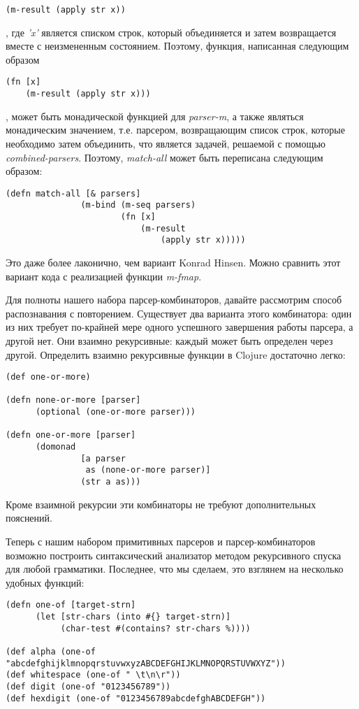 \documentclass[a4paper,12pt]{article}
\newcommand{\cl}[1] {{\it #1}}
\begin{document}
\begin{verbatim}
(m-result (apply str x))
\end{verbatim}
, где \cl{'x'} является списком строк, который объединяется и затем возвращается вместе с неизмененным состоянием. 
Поэтому, функция, написанная следующим образом

\begin{verbatim}
(fn [x]
    (m-result (apply str x)))
\end{verbatim}
, может быть монадической функцией для \cl{parser-m}, а также являться монадическим значением, т.е. парсером,
возвращающим список строк, которые необходимо затем объединить, что является задачей, решаемой с помощью 
\cl{combined-parsers}. Поэтому, \cl{match-all} может быть переписана следующим образом:

\begin{verbatim}
(defn match-all [& parsers]
               (m-bind (m-seq parsers)
                       (fn [x]
                           (m-result
                               (apply str x)))))
\end{verbatim}

Это даже более лаконично, чем вариант Konrad Hinsen. Можно сравнить этот вариант кода с реализацией функции \cl{m-fmap}. 

Для полноты нашего набора парсер-комбинаторов, давайте рассмотрим способ распознавания с повторением.
Существует два варианта этого комбинатора: один из них требует по-крайней мере одного успешного завершения
работы парсера, а другой нет. Они взаимно рекурсивные: каждый может быть определен через другой. 
Определить взаимно рекурсивные функции в Clojure достаточно легко:

\begin{verbatim}
(def one-or-more)

(defn none-or-more [parser]
      (optional (one-or-more parser)))

(defn one-or-more [parser]
      (domonad
               [a parser
                as (none-or-more parser)]
               (str a as)))
\end{verbatim}

Кроме взаимной рекурсии эти комбинаторы не требуют дополнительных пояснений.

Теперь с нашим набором примитивных парсеров и парсер-комбинаторов возможно построить 
синтаксический анализатор методом рекурсивного спуска для любой грамматики. Последнее,
что мы сделаем, это взглянем на несколько удобных функций:

\begin{verbatim}
(defn one-of [target-strn]
      (let [str-chars (into #{} target-strn)]
           (char-test #(contains? str-chars %))))

(def alpha (one-of "abcdefghijklmnopqrstuvwxyzABCDEFGHIJKLMNOPQRSTUVWXYZ"))
(def whitespace (one-of " \t\n\r"))
(def digit (one-of "0123456789"))
(def hexdigit (one-of "0123456789abcdefghABCDEFGH"))
\end{verbatim}
\end{document}

